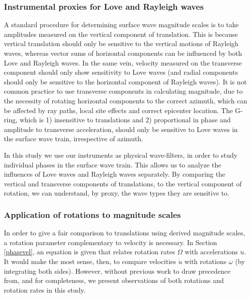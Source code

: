 \documentclass{gji}
\begin{document}
\subsubsection{Instrumental proxies for Love and Rayleigh waves}\label{proxy}
A standard procedure for determining surface wave magnitude scales is to take amplitudes measured on the vertical component of translation. This is because vertical translation should only be sensitive to the vertical motions of Rayleigh waves, whereas vector sums of horizontal components can be influenced by both Love and Rayleigh waves. In the same vein, velocity measured on the transverse component should only show sensitivity to Love waves (and radial components should only be sensitive to the horizontal component of Rayleigh waves). It is not common practice to use transverse components in calculating magnitude, due to the necessity of rotating horizontal components to the correct azimuth, which can be affected by ray paths, local site effects and correct epicenter location. The G-ring, which is 1) insensitive to translations and 2) proportional in phase and amplitude to transverse acceleration, should only be sensitive to Love waves in the surface wave train, irrespective of azimuth.  

In this study we use our instruments as physical wave-filters, in order to study individual phases in the surface wave train. This allows us to analyze the influences of Love waves and Rayleigh waves separately. By comparing the vertical and transverse components of translations, to the vertical component of rotation, we can understand, by proxy, the wave types they are sensitive to.

\subsubsection{Application of rotations to magnitude scales}
In order to give a fair comparison to translations using derived magnitude scales, a rotation parameter complementary to velocity is necessary. In Section \ref{phasevel}, an equation is given that relates rotation rates $\Omega$ with accelerations $\ddot{u}$. It would make the most sense, then, to compare velocities $\dot{u}$ with rotations $\omega$ (by integrating both sides). However, without previous work to draw precedence from, and for completeness, we present observations of both rotations and rotation rates in this study.
\end{document}
